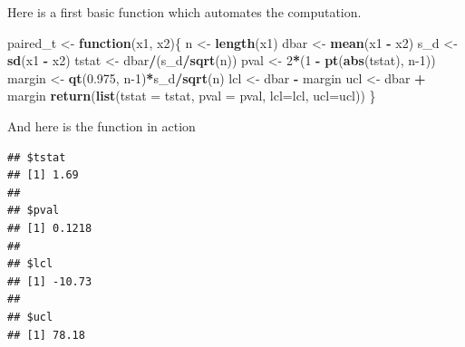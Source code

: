 \documentclass[
]{krantz}
\newenvironment{Shaded}{\begin{snugshade}}{\end{snugshade}}
\newcommand{\ControlFlowTok}[1]{\textcolor[rgb]{0.13,0.29,0.53}{\textbf{#1}}}
\newcommand{\DataTypeTok}[1]{\textcolor[rgb]{0.13,0.29,0.53}{#1}}
\newcommand{\DecValTok}[1]{\textcolor[rgb]{0.00,0.00,0.81}{#1}}
\newcommand{\FloatTok}[1]{\textcolor[rgb]{0.00,0.00,0.81}{#1}}
\newcommand{\KeywordTok}[1]{\textcolor[rgb]{0.13,0.29,0.53}{\textbf{#1}}}
\newcommand{\NormalTok}[1]{#1}
\newcommand{\OperatorTok}[1]{\textcolor[rgb]{0.81,0.36,0.00}{\textbf{#1}}}
\newcommand{\StringTok}[1]{\textcolor[rgb]{0.31,0.60,0.02}{#1}}
\begin{document}
Here is a first basic function which automates the computation.

\begin{Shaded}
\begin{Highlighting}[]
\NormalTok{paired\_t \textless{}{-}}\StringTok{ }\ControlFlowTok{function}\NormalTok{(x1, x2)\{}
\NormalTok{    n \textless{}{-}}\StringTok{ }\KeywordTok{length}\NormalTok{(x1)}
\NormalTok{    dbar \textless{}{-}}\StringTok{ }\KeywordTok{mean}\NormalTok{(x1 }\OperatorTok{{-}}\StringTok{ }\NormalTok{x2)}
\NormalTok{    s\_d \textless{}{-}}\StringTok{ }\KeywordTok{sd}\NormalTok{(x1 }\OperatorTok{{-}}\StringTok{ }\NormalTok{x2)}
\NormalTok{    tstat \textless{}{-}}\StringTok{ }\NormalTok{dbar}\OperatorTok{/}\NormalTok{(s\_d}\OperatorTok{/}\KeywordTok{sqrt}\NormalTok{(n))}
\NormalTok{    pval \textless{}{-}}\StringTok{ }\DecValTok{2}\OperatorTok{*}\NormalTok{(}\DecValTok{1} \OperatorTok{{-}}\StringTok{ }\KeywordTok{pt}\NormalTok{(}\KeywordTok{abs}\NormalTok{(tstat), n}\DecValTok{{-}1}\NormalTok{))}
\NormalTok{    margin \textless{}{-}}\StringTok{ }\KeywordTok{qt}\NormalTok{(}\FloatTok{0.975}\NormalTok{, n}\DecValTok{{-}1}\NormalTok{)}\OperatorTok{*}\NormalTok{s\_d}\OperatorTok{/}\KeywordTok{sqrt}\NormalTok{(n)}
\NormalTok{    lcl \textless{}{-}}\StringTok{ }\NormalTok{dbar }\OperatorTok{{-}}\StringTok{ }\NormalTok{margin}
\NormalTok{    ucl \textless{}{-}}\StringTok{ }\NormalTok{dbar }\OperatorTok{+}\StringTok{ }\NormalTok{margin}
    \KeywordTok{return}\NormalTok{(}\KeywordTok{list}\NormalTok{(}\DataTypeTok{tstat =}\NormalTok{ tstat, }\DataTypeTok{pval =}\NormalTok{ pval, }\DataTypeTok{lcl=}\NormalTok{lcl, }\DataTypeTok{ucl=}\NormalTok{ucl))}
\NormalTok{\}}
\end{Highlighting}
\end{Shaded}

And here is the function in action

\begin{Shaded}
\end{Shaded}

\begin{verbatim}
## $tstat
## [1] 1.69
## 
## $pval
## [1] 0.1218
## 
## $lcl
## [1] -10.73
## 
## $ucl
## [1] 78.18
\end{verbatim}
\end{document}
